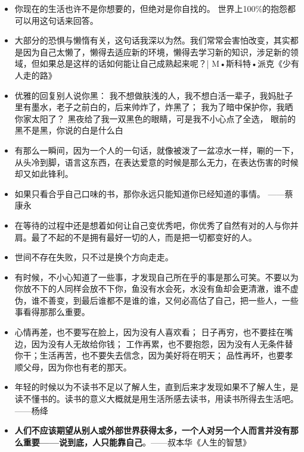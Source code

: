 \documentclass[UTF8,a4paper,8pt]{ctexbook}
\begin{document}
\begin{itemize}
		\item 你现在的生活也许不是你想要的，但绝对是你自找的。 世界上100\%的抱怨都可以用这句话来回答。
		
		\item 大部分的恐惧与懒惰有关，这句话我深以为然。我们常常会害怕改变，其实都是因为自己太懒了，懒得去适应新的环境，懒得去学习新的知识，涉足新的领域，但如果总是这样的话如何能让自己成熟起来呢？| M•斯科特•派克《少有人走的路》
		
		\item  优雅的回复别人说你黑： 我不想做肤浅的人，我不想白活一辈子，我妈肚子里有墨水，老子之前白的，后来帅炸了，炸黑了； 我为了暗中保护你，我晒你家太阳了？ 黑夜给了我一双黑色的眼睛，可是我不小心点了全选， 眼前的黑不是黑，你说的白是什么白
		
		\item 有那么一瞬间，因为一个人的一句话，就像被泼了一盆凉水一样，唰的一下，从头冷到脚，语言这东西，在表达爱意的时候是那么无力，在表达伤害的时候却又如此锋利。
		
		\item 如果只看合乎自己口味的书，那你永远只能知道你已经知道的事情。 ——蔡康永
		
		\item 在等待的过程中还是想着如何让自己变优秀吧，你优秀了自然有对的人与你并肩。最了不起的不是拥有最好一切的人，而是把一切都变好的人。
		
		\item 世间不存在失败，只不过是换个方向走走。
		
		\item 有时候，不小心知道了一些事，才发现自己所在乎的事是那么可笑。不要以为你放不下的人同样会放不下你，鱼没有水会死，水没有鱼却会更清澈，谁不虚伪，谁不善变，到最后谁都不是谁的谁，又何必高估了自己，把一些人，一些事看得那那么重要。
		
		\item 心情再差，也不要写在脸上，因为没有人喜欢看； 日子再穷，也不要挂在嘴边，因为没有人无故给你钱； 工作再累，也不要抱怨，因为没有人无条件替你干；生活再苦，也不要失去信念，因为美好将在明天； 品性再坏，也要孝顺父母，因为你也有老的那天。
		
		\item 年轻的时候以为不读书不足以了解人生，直到后来才发现如果不了解人生，是读不懂书的。读书的意义大概就是用生活所感去读书，用读书所得去生活吧。——杨绛
		
		\item \textbf{人们不应该期望从别人或外部世界获得太多，一个人对另一个人而言并没有那么重要——说到底，人只能靠自己}。——叔本华《人生的智慧》
		

\end{itemize}
\end{document}
